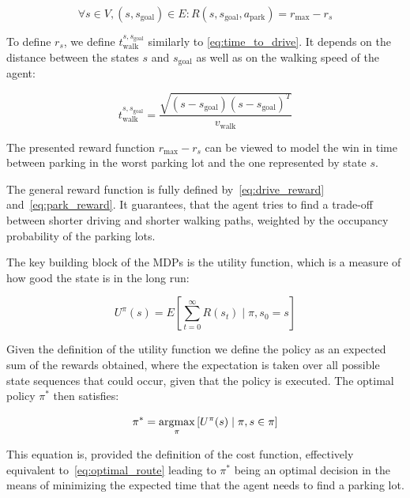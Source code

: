 \begin{equation}
\label{eq:park_reward}
\forall s \in V, (s, s_{\mathrm{goal}}) \in E : R(s, s_{\mathrm{goal}}, a_{\mathrm{park}}) = r_{\max} - r_s
\end{equation}

To define $r_s$, we define $t_{\mathrm{walk}}^{s,s_{\mathrm{goal}}}$ similarly
to \eqref{eq:time_to_drive}. It depends on the distance between the states $s$ and $s_\mathrm{goal}$ as well as on the walking speed of the agent:

\begin{equation}
t_{\mathrm{walk}}^{s,s_{\mathrm{goal}}} = \frac{\sqrt{(s -
s_{\mathrm{goal}}) {(s - s_{\mathrm{goal}})}^T}}{v_{\mathrm{walk}}}
\end{equation}

The presented reward function $r_{\max} - r_s$ can be viewed to model the win
in time between parking in the worst parking lot and the one represented by
state $s$.

The general reward function is fully defined by~\eqref{eq:drive_reward}
and~\eqref{eq:park_reward}. It guarantees, that the agent tries to find a
trade-off between shorter driving and shorter walking paths, weighted by the
occupancy probability of the parking lots.

The key building block of the MDPs is  the utility function, which is a
measure of how good the state is in the long run:

\begin{equation}
\label{eq:non_discount_utility}
U^{\pi}(s) = E\left[\sum_{t=0}^{\infty} R(s_t) \mid \pi,s_0 = s \right]
\end{equation}

Given the definition of the utility function we define the policy as an
expected sum of the rewards obtained, where the expectation is taken over all
possible state sequences that could occur, given that the policy is executed.
The optimal policy $\pi^*$ then satisfies:

\begin{equation}
\label{eq:optimal_policy}
\pi^* = \mathop{\rm argmax}_\pi \left[ U^{\pi}(s) \mid \pi, s \in \pi \right]
\end{equation}

This equation is, provided the definition of the cost function, effectively
equivalent to~\eqref{eq:optimal_route} leading to $\pi^*$ being an optimal
decision in the means of minimizing the expected time that the agent needs to
find a parking lot.

